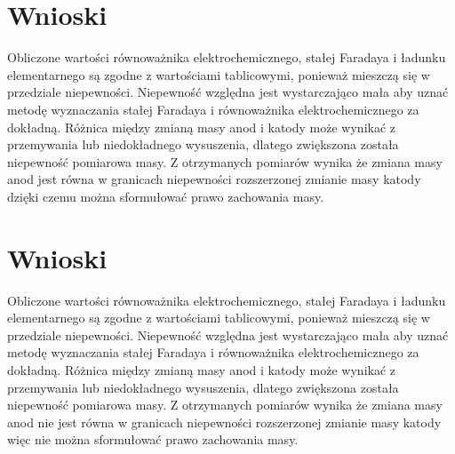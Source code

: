 \documentclass{article}
\begin{document}
\section{Wnioski}

Obliczone wartości równoważnika elektrochemicznego, stałej Faradaya i ładunku elementarnego są zgodne z wartościami tablicowymi, ponieważ mieszczą się w przedziale niepewności. Niepewność względna jest wystarczająco mała aby uznać metodę wyznaczania stałej Faradaya i równoważnika elektrochemicznego za dokładną. Różnica między zmianą masy anod i katody może wynikać z przemywania lub niedokładnego wysuszenia, dlatego zwiększona została niepewność pomiarowa masy. Z otrzymanych pomiarów wynika że zmiana masy anod jest równa w granicach niepewności rozszerzonej  zmianie masy katody dzięki czemu można sformułować prawo zachowania masy.
\newpage

\setcounter{section}{4}
\section{Wnioski}

Obliczone wartości równoważnika elektrochemicznego, stałej Faradaya i ładunku elementarnego są zgodne z wartościami tablicowymi, ponieważ mieszczą się w przedziale niepewności. Niepewność względna jest wystarczająco mała aby uznać metodę wyznaczania stałej Faradaya i równoważnika elektrochemicznego za dokładną. Różnica między zmianą masy anod i katody może wynikać z przemywania lub niedokładnego wysuszenia, dlatego zwiększona została niepewność pomiarowa masy. Z otrzymanych pomiarów wynika że zmiana masy anod nie jest równa w granicach niepewności rozszerzonej zmianie masy katody więc nie można sformułować prawo zachowania masy.
\end{document}
